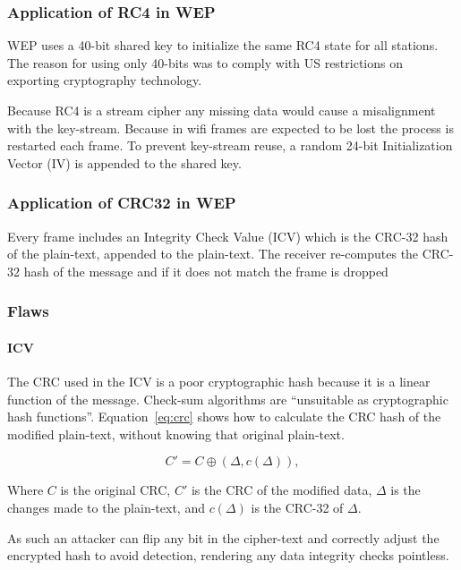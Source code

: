 \documentclass[pdftex, 12pt, a4paper]{article}
\begin{document}
\subsubsection{Application of RC4 in WEP}
WEP uses a 40-bit shared key to initialize the same RC4 state for all stations. The reason for using only 40-bits was to comply with US restrictions on exporting cryptography technology\cite{wep-evolution}.

Because RC4 is a stream cipher any missing data would cause a misalignment with the key-stream. Because in wifi frames are expected to be lost the process is restarted each frame.  To prevent key-stream reuse, a random 24-bit Initialization Vector (IV)\label{p:iv} is appended to the shared key.

\subsubsection{Application of CRC32 in WEP}
Every frame includes an Integrity Check Value (ICV) which is the CRC-32 hash of the plain-text, appended to the plain-text.  The receiver re-computes the CRC-32 hash of the message and if it does not match the frame is dropped

\subsubsection{Flaws}

\paragraph{ICV}
The CRC used in the ICV is a poor cryptographic hash because it is a linear function of the message. Check-sum algorithms are ``unsuitable as cryptographic hash functions''\cite{wiki-crc}. Equation~\ref{eq:crc} shows how to calculate the CRC hash of the modified plain-text, without knowing that original plain-text.

\begin{equation}\label{eq:crc}
C'=C \oplus (\Delta ,c(\Delta)),
\end{equation}

Where $C$ is the original CRC, $C'$ is the CRC of the modified data, $\Delta$ is the changes made to the plain-text, and $c(\Delta)$ is the CRC-32 of $\Delta$.

As such an attacker can flip any bit in the cipher-text and correctly adjust the encrypted hash to avoid detection, rendering any data integrity checks pointless.
\end{document}
